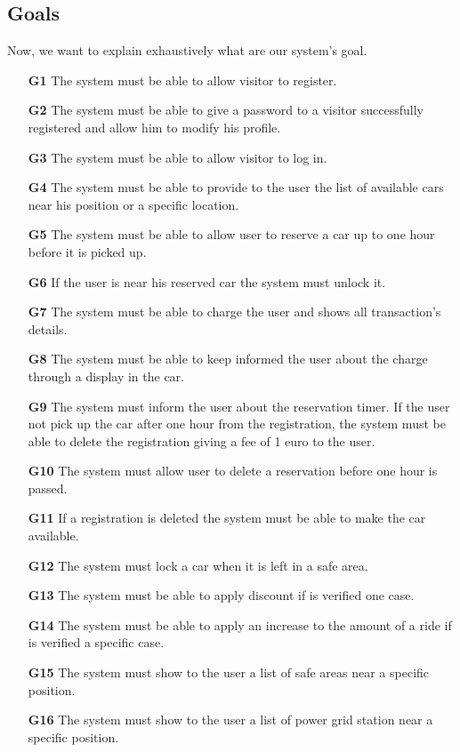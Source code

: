 \subsection{Goals} \label{subsec:goals}
Now, we want to explain exhaustively what are our system's goal.
\begin{itemize}
\item[\textbf{G1}] The system must be able to allow visitor to register. 
\item[\textbf{G2}] The system must be able to give a password to a visitor successfully registered and allow him to modify his profile.
\item[\textbf{G3}] The system must be able to allow visitor to log in.
\item[\textbf{G4}] The system must be able to provide to the user the list of available cars near his position or a specific location.
\item[\textbf{G5}] The system must be able to allow user to reserve a car up to one hour before it is picked up.
\item[\textbf{G6}] If the user is near his reserved car the system must unlock it.
\item[\textbf{G7}] The system must be able to charge the user and shows all transaction's details.
\item[\textbf{G8}] The system must be able to keep informed the user about the charge through a display in the car.
\item[\textbf{G9}] The system must inform the user about the reservation timer. If the user not pick up the car after one hour from the registration, the system must be able to delete the registration giving a fee of 1 euro to the user.
\item[\textbf{G10}] The system must allow user to delete a reservation before one hour is passed.
\item[\textbf{G11}] If a registration is deleted the system must be able to make the car available.
\item[\textbf{G12}] The system must lock a car when it is left in a safe area.
\item[\textbf{G13}] The system must be able to apply discount if is verified one case.
\item[\textbf{G14}] The system must be able to apply an increase to the amount of a ride if is verified a specific case.
\item[\textbf{G15}] The system must show to the user a list of safe areas near a specific position.
\item[\textbf{G16}] The system must show to the user a list of power grid station near a specific position.

\end{itemize}



